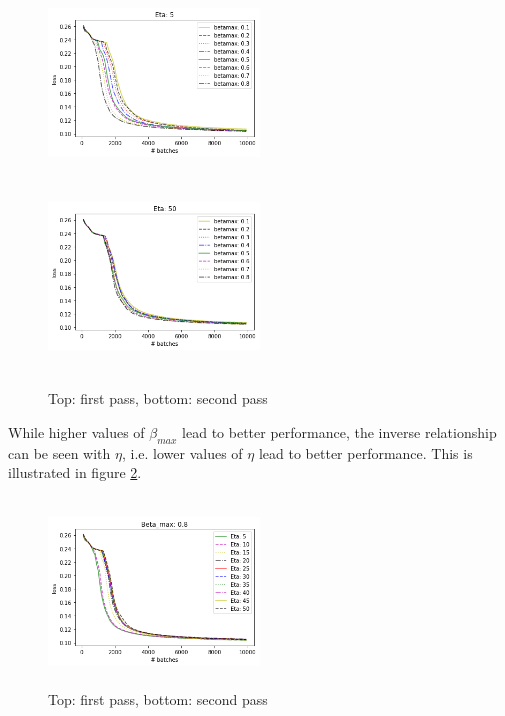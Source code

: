 \documentclass{article}
\begin{document}
\begin{figure}[H]
      \centering
      \includegraphics[width=0.5\textwidth,height=5cm,keepaspectratio]{img/appendix/hyper/eta5.png}
      \includegraphics[width=0.5\textwidth,height=5cm,keepaspectratio]{img/appendix/hyper/eta50.png}
      \caption{Top: first pass, bottom: second pass}
      \label{fig:hyper1}
  \end{figure}

While higher values of $\beta_{max}$ lead to better performance, the inverse relationship can be seen with $\eta$, i.e. lower values of $\eta$ lead to better performance. This is illustrated in figure \ref{fig:hyper2}.  

\begin{figure}[H]
      \centering
      \includegraphics[width=0.5\textwidth,height=5cm,keepaspectratio]{img/appendix/hyper/betamax08.png}
      
      \caption{Top: first pass, bottom: second pass}
      \label{fig:hyper2}
 \end{figure}
 
\end{document}
